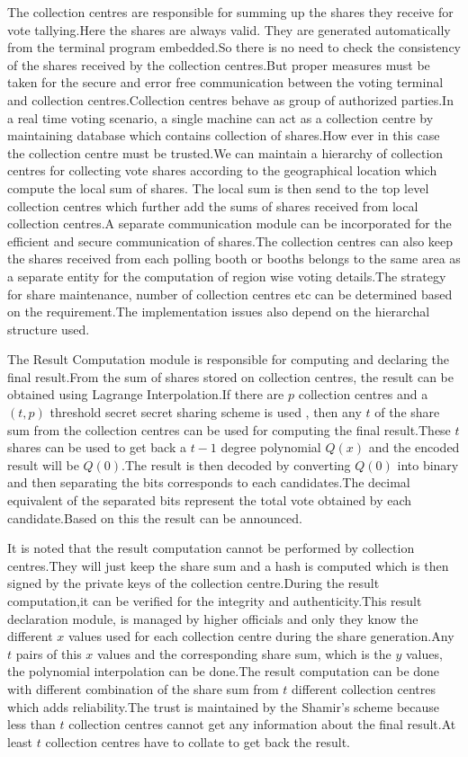 \documentclass[conference]{IEEEtran}
\begin{document}
The collection centres are responsible  for summing up the shares they receive for vote tallying.Here the shares are always valid. They are generated automatically from the terminal program embedded.So there is no need
to check the consistency of the shares received by the collection centres.But proper measures must be taken for the secure and error free communication between the voting terminal and collection centres.Collection centres behave as group of authorized parties.In a real time voting scenario, a single machine can act as a collection centre by maintaining database which contains collection of shares.How ever in this case the collection centre must be trusted.We can maintain a hierarchy of collection  centres for collecting vote shares according to the geographical location which compute the local sum of shares. The local sum is then send to the top level collection centres which further add the sums of shares received from local collection centres.A separate communication module can be incorporated for the efficient and secure communication of shares.The collection centres can also keep the shares received from each polling booth
or booths belongs to the same area as a separate entity for the computation of region wise voting details.The strategy for share maintenance, number of collection centres etc can be determined based on the requirement.The implementation issues also depend on the hierarchal structure used.


The Result Computation module is responsible for computing and declaring the final result.From the sum of shares stored on collection centres, the result can be obtained using Lagrange Interpolation.If there are $p$ collection centres and a $(t,p)$ threshold secret secret sharing scheme is used , then any $t$ of the share sum from the collection centres can be used for computing the final result.These $t$ shares can be used to get back a $t-1$ degree polynomial $Q(x)$ and the encoded result will be $Q(0)$.The result is then decoded by converting $Q(0)$ into binary and then separating the bits corresponds to each candidates.The decimal equivalent of the separated bits represent the total vote obtained by each candidate.Based on this the result can be announced.

It is noted that the result computation cannot be performed by collection centres.They will just keep the share sum and a hash is computed which is then signed by the private keys of the collection centre.During the result computation,it can be verified for the integrity and authenticity.This result declaration module, is managed by  higher officials and only they know the different $x$ values used for each collection centre during the share generation.Any $t$ pairs of this $x$ values and the corresponding share sum, which is the $y$ values, the polynomial interpolation can be done.The result computation can be done with different combination of the share sum from $t$ different collection centres which adds reliability.The trust is maintained by the Shamir's scheme because less than $t$ collection centres cannot get any information about the final result.At least $t$ collection centres have to collate to get back the result.
\end{document}
